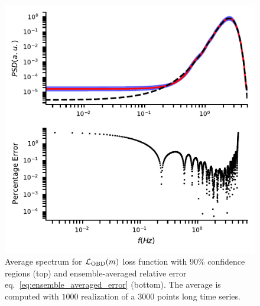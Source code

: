 \documentclass[twocolumn,showpacs,preprintnumbers,nofootinbib,prd,
superscriptaddress,10pt]{revtex4-1}
\begin{document}
\begin{figure}[t]
	\centering
	\includegraphics[width = \linewidth]{Images/optimisers_comparison/normal/OBD_spectrum_estim.pdf}
	\caption{Average spectrum for $\mathcal{L}_{\rm OBD}(m)$ loss function with 90\% confidence regions (top) and ensemble-averaged relative error eq.~\eqref{eq:ensemble_averaged_error} (bottom). The average is computed with $1000$ realization of a $3000$ points long time series.}
	\label{fig:OBDmean}
\end{figure}
\end{document}
